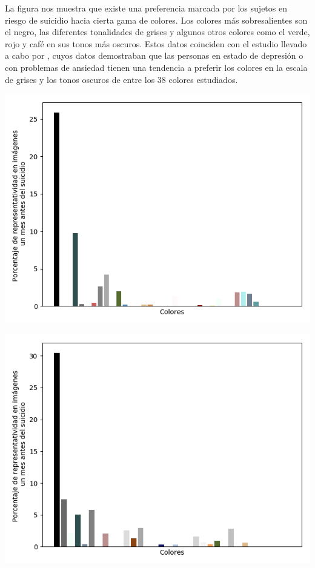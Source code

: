 \documentclass[12pt, donotrepeattitle, jou]{apa6}
\begin{document}
    La figura nos muestra que existe una preferencia marcada por los sujetos en riesgo de suicidio hacia cierta gama de colores. Los colores más sobresalientes son el negro, las diferentes tonalidades de grises y algunos otros colores como el verde, rojo y café en sus tonos más oscuros. Estos datos coinciden con el estudio llevado a cabo por \textcite{Carruthers2010}, cuyos datos demostraban que las personas en estado de depresión o con problemas de ansiedad tienen una tendencia a preferir los colores en la escala de grises y los tonos oscuros de entre los 38 colores estudiados.
    
    \begin{center}
        \begin{minipage}{0.3\linewidth}
            \includegraphics[width=\linewidth]{images/colors_angie}
        \end{minipage}
        \begin{minipage}{0.3\linewidth}
            \includegraphics[width=\linewidth]{images/colors_juan}

\end{minipage}
\end{center}
\end{document}
